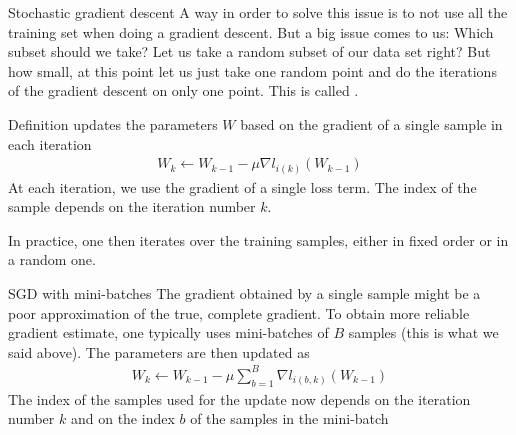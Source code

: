 \begin{parag}{Stochastic gradient descent}
    A way in order to solve this issue is to not use all the training set when doing a gradient descent. But a big issue comes to us: Which subset should we take? Let us take a random subset of our data set right? But how small, at this point let us just take one random point and do the iterations of the gradient descent on only one point. This is called .
	\begin{subparag}{Definition}
	     updates the parameters $W$ based on the gradient of a single sample in each iteration 
		\begin{align*} 
			W_{k} \leftarrow W_{k-1} - \mu \nabla l_{i\left(k\right)} \left(W_{k-1}\right)
		\end{align*}
		At each iteration, we use the gradient of a single loss term. The index of the sample depends on the iteration number $k$.
	\end{subparag}
	In practice, one then iterates over the training samples, either in fixed order or in a random one.
\end{parag}

\begin{parag}{SGD with mini-batches}
    The gradient obtained by a single sample might be a poor approximation of the true, complete gradient. To obtain more reliable gradient estimate, one typically uses mini-batches of $B$ samples (this is what we said above). The parameters are then updated as 
	\begin{align*} 
		W_{k} \leftarrow W_{k-1} - \mu \sum_{b= 1}^{B} \nabla l_{i\left(b, k\right)} \left(W_{k-1}\right)
	\end{align*}
	The index of the samples used for the update now depends on the iteration number $k$ and on the index $b$ of the samples in the mini-batch
\end{parag}





